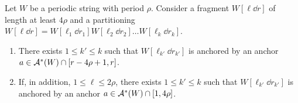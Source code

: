 \begin{lemma}\label{lm:anchors_catch_partial_match}
Let $W$ be a periodic string with period $\rho$. Consider a fragment $W[\ell \dd r]$ of length at least $4 \rho$ and a partitioning $W[\ell \dd r] = W[\ell_1 \dd r_1] W[\ell_2 \dd r_2] \ldots W[\ell_k \dd r_k]$. 
\begin{enumerate}[label=\textrm{(\alph*)}]
\item There exists $1 \le k' \le k$ such that $W[\ell_{k'} \dd r_{k'}]$ is anchored by an anchor $a \in \mathcal{A}^\ast(W) \cap [r-4\rho+1, r]$.\label{it:anchor_gen}
\item If, in addition, $1 \le \ell \le 2 \rho$, there exists $1 \le k' \le k$ such that $W[\ell_{k'} \dd r_{k'}]$ is anchored by an anchor $a \in \mathcal{A}^\ast(W) \cap [1, 4\rho]$.\label{it:anchor_beg}
\end{enumerate}
\end{lemma}
